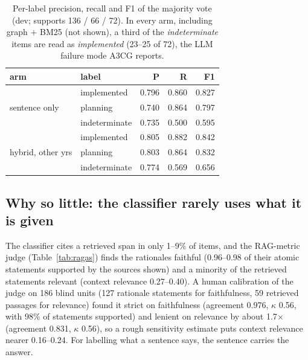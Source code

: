 \documentclass[11pt]{article}
\newcommand{\kappaval}{$\kappa$}
\begin{document}
\begin{table}[t]
\centering\footnotesize
\setlength{\tabcolsep}{4pt}
\begin{tabular}{@{}llrrr@{}}
\toprule
arm & label & P & R & F1 \\
\midrule
\multirow{3}{*}{sentence only} & implemented & 0.796 & 0.860 & 0.827 \\
 & planning & 0.740 & 0.864 & 0.797 \\
 & indeterminate & 0.735 & 0.500 & 0.595 \\
\midrule
\multirow{3}{*}{hybrid, other yrs} & implemented & 0.805 & 0.882 & 0.842 \\
 & planning & 0.803 & 0.864 & 0.832 \\
 & indeterminate & 0.774 & 0.569 & 0.656 \\
\bottomrule
\end{tabular}
\caption{Per-label precision, recall and F1 of the majority vote (dev; supports 136 / 66 / 72). In every arm, including graph + BM25 (not shown), a third of the \emph{indeterminate} items are read as \emph{implemented} (23--25 of 72), the LLM failure mode A3CG reports.}
\label{tab:rq1-labels}
\end{table}

\subsection{Why so little: the classifier rarely uses what it is given}
\label{sec:rq1-why}
The classifier cites a retrieved span in only 1--9\% of items, and the RAG-metric judge (Table~\ref{tab:ragas}) finds the rationales faithful (0.96--0.98 of their atomic statements supported by the sources shown) and a minority of the retrieved statements relevant (context relevance 0.27--0.40). A human calibration of the judge on 186 blind units (127 rationale statements for faithfulness, 59 retrieved passages for relevance) found it strict on faithfulness (agreement 0.976, \kappaval{} 0.56, with 98\% of statements supported) and lenient on relevance by about 1.7$\times$ (agreement 0.831, \kappaval{} 0.56), so a rough sensitivity estimate puts context relevance nearer 0.16--0.24. For labelling what a sentence says, the sentence carries the answer.
\end{document}
